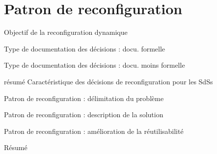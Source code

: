 \section{Patron de reconfiguration}

\begin{frame}{Objectif de la reconfiguration dynamique}
\end{frame}


\begin{frame}{Type de documentation des décisions : docu. formelle}
\end{frame}

\begin{frame}{Type de documentation des décisions : docu. moins
formelle}
\end{frame}


\begin{frame}{ résumé Caractéristique des décisions de reconfiguration
pour les SdSs}
\end{frame}


\begin{frame}{Patron de reconfiguration : délimitation du problème}
\end{frame}

\begin{frame}{Patron de reconfiguration : description de la solution}
\end{frame}

\begin{frame}{Patron de reconfiguration : amélioration de la
réutilisabilité}
\end{frame}

\begin{frame}{Résumé}
\end{frame}
